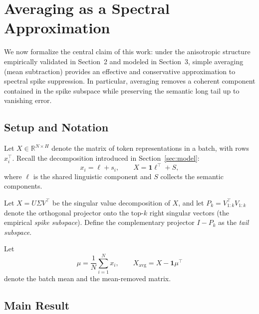 \section{Averaging as a Spectral Approximation}
\label{sec:averaging_spectral}

We now formalize the central claim of this work: under the anisotropic structure
empirically validated in Section~2 and modeled in Section~3, simple averaging
(mean subtraction) provides an effective and conservative approximation to
spectral spike suppression.
In particular, averaging removes a coherent component contained in the spike
subspace while preserving the semantic long tail up to vanishing error.

\subsection{Setup and Notation}

Let $X \in \mathbb{R}^{N\times H}$ denote the matrix of token representations in a
batch, with rows $x_i^\top$.
Recall the decomposition introduced in Section~\ref{sec:model}:
\[
x_i = \ell + s_i,
\qquad
X = \mathbf{1}\ell^\top + S,
\]
where $\ell$ is the shared linguistic component and $S$ collects the semantic
components.

Let $X = U\Sigma V^\top$ be the singular value decomposition of $X$, and let
$P_k = V_{1:k}^\top V_{1:k}$ denote the orthogonal projector onto the top-$k$
right singular vectors (the empirical \emph{spike subspace}).
Define the complementary projector $I-P_k$ as the \emph{tail subspace}.

Let
\[
\mu = \frac{1}{N}\sum_{i=1}^N x_i,
\qquad
X_{\mathrm{avg}} = X - \mathbf{1}\mu^\top
\]
denote the batch mean and the mean-removed matrix.

\subsection{Main Result}


